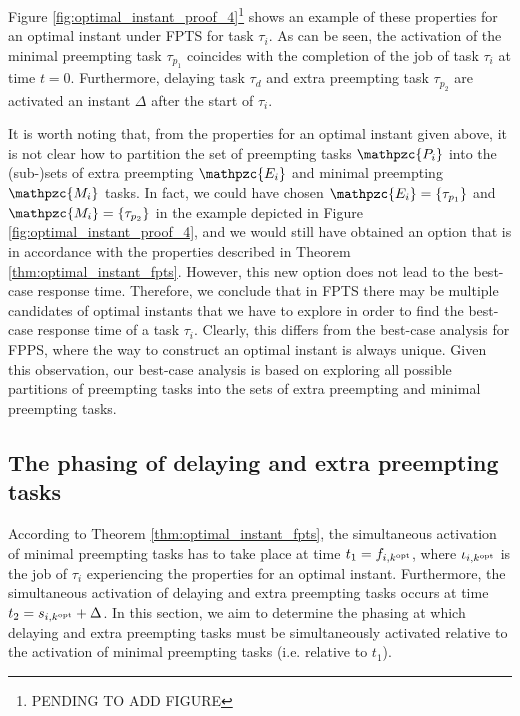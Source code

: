 Figure \ref{fig:optimal_instant_proof_4}\footnote{PENDING TO ADD FIGURE} shows an example of these properties for an optimal instant under FPTS for task $\tau_i$. As can be seen, the activation of the minimal preempting task $\tau_{p_1}$ coincides with the completion of the job of task $\tau_i$ at time $t=0$. Furthermore, {delaying} task $\tau_d$ and extra preempting task $\tau_{p_2}$ are activated an instant $\Delta$ after the start of $\tau_i$.

It is worth noting that, from the properties for an optimal instant given above, it is not clear how to partition the set of preempting tasks $\mathpzc{P_i}$ into the (sub-)sets of extra preempting $\mathpzc{E_i}$ and minimal preempting $\mathpzc{M_i}$ tasks. In fact, we could have chosen $\mathpzc{E_i}=\{\tau_{p_1}\}$ and $\mathpzc{M_i}=\{\tau_{p_2}\}$ in the example depicted in Figure \ref{fig:optimal_instant_proof_4}, and we would still have obtained an option that is in accordance with the properties described in Theorem \ref{thm:optimal_instant_fpts}. However, this new option does not lead to the best-case response time. Therefore, we conclude that in FPTS there may be multiple candidates of optimal instants that we have to explore in order to find the best-case response time of a task $\tau_i$. Clearly, this differs from the best-case analysis for FPPS, where the way to construct an optimal instant is always unique. Given this observation, our best-case analysis is based on exploring all possible partitions of preempting tasks into the sets of extra preempting and minimal preempting tasks.

\iffalse
\subsection{The phasing of delaying and extra preempting tasks} \label{sec:phasing_delaying_extra}

According to Theorem \ref{thm:optimal_instant_fpts}, the simultaneous activation of minimal preempting tasks has to take place at time $t_1=f_{i,k^{\rm{opt}}}$, where $\iota_{i,k^{\rm{opt}}}$ is the job of $\tau_i$ experiencing the properties for an optimal instant. Furthermore, the simultaneous activation of delaying and extra preempting tasks occurs at time $t_2=s_{i,k^{\rm{opt}}}+\Delta$. In this section, we aim to determine the phasing at which delaying and extra preempting tasks must be simultaneously activated relative to the activation of minimal preempting tasks (i.e. relative to $t_1$).


